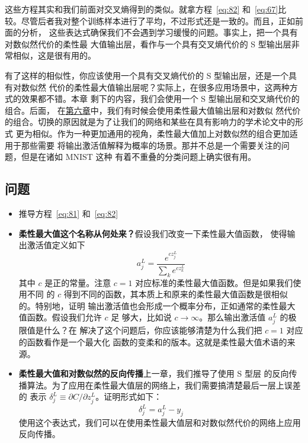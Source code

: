 这些方程其实和我们前面对交叉熵得到的类似。就拿方程~\eqref{eq:82} 和~\eqref{eq:67}比
较。尽管后者我对整个训练样本进行了平均，不过形式还是一致的。而且，正如前面的分析，
这些表达式确保我们不会遇到学习缓慢的问题。事实上，把一个具有对数似然代价的柔性最
大值输出层，看作与一个具有交叉熵代价的 S 型输出层非常相似，这是很有用的。

有了这样的相似性，你应该使用一个具有交叉熵代价的 S 型输出层，还是一个具有对数似然
代价的柔性最大值输出层呢？实际上，在很多应用场景中，这两种方式的效果都不错。本章
剩下的内容，我们会使用一个 S 型输出层和交叉熵代价的组合。后面，
在\hyperref[ch:Deeplearning]{第六章}中，我们有时候会使用柔性最大值输出层和对数似
然代价的组合。切换的原因就是为了让我们的网络和某些在具有影响力的学术论文中的形式
更为相似。作为一种更加通用的视角，柔性最大值加上对数似然的组合更加适用于那些需要
将输出激活值解释为概率的场景。那并不总是一个需要关注的问题，但是在诸如 MNIST 这种
有着不重叠的分类问题上确实很有用。

\subsection*{问题}

\begin{itemize}
\item 推导方程~\eqref{eq:81} 和~\eqref{eq:82}
\item \textbf{柔性最大值这个名称从何处来？}\quad 假设我们改变一下柔性最大值函数，
  使得输出激活值定义如下
  \begin{equation}
    a^L_j = \frac{e^{c z^L_j}}{\sum_k e^{c z^L_k}}
    \label{eq:83}\tag{83}
  \end{equation}
  其中 $c$ 是正的常量。注意 $c=1$ 对应标准的柔性最大值函数。但是如果我们使用不同
  的 $c$ 得到不同的函数，其本质上和原来的柔性最大值函数是很相似的。特别地，证明
  输出激活值也会形成一个概率分布，正如通常的柔性最大值函数。假设我们允许 $c$ 足
  够大，比如说 $c\rightarrow \infty$。那么输出激活值 $a_j^L$ 的极限值是什么？在
  解决了这个问题后，你应该能够清楚为什么我们把 $c=1$ 对应的函数看作是一个最大化
  函数的变柔和的版本。这就是柔性最大值术语的来源。
\item \textbf{柔性最大值和对数似然的反向传播}\quad 上一章，我们推导了使用 S 型层
  的反向传播算法。为了应用在柔性最大值层的网络上，我们需要搞清楚最后一层上误差的
  表示 $\delta^L_j \equiv \partial C / \partial z^L_j$。证明形式如下：
  \begin{equation}
    \delta^L_j = a^L_j -y_j
    \label{eq:84}\tag{84}
  \end{equation}
  使用这个表达式，我们可以在使用柔性最大值层和对数似然代价的网络上应用反向传播。
\end{itemize}

